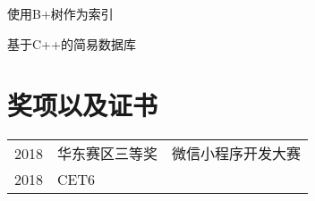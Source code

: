 \documentclass[]{deedy-resume-openfont}
\begin{document}
\begin{minipage}[t]{0.68\textwidth}
\begin{tightemize}
    \item 使用B+树作为索引
    \item 基于C++的简易数据库
\end{tightemize}
\sectionsep






\section{奖项以及证书} 
\begin{tabular}{rll}
2018         & 华东赛区三等奖  & 微信小程序开发大赛 \\
2018         & CET6 \\
\end{tabular}
\sectionsep



\end{minipage}
\end{document}

